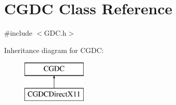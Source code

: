 \hypertarget{class_c_g_d_c}{}\section{C\+G\+D\+C Class Reference}
\label{class_c_g_d_c}


{\ttfamily \#include $<$G\+D\+C.\+h$>$}

Inheritance diagram for C\+G\+D\+C\+:\begin{figure}[H]
\begin{center}
\leavevmode
\includegraphics[height=2.000000cm]{class_c_g_d_c}
\end{center}
\end{figure}

